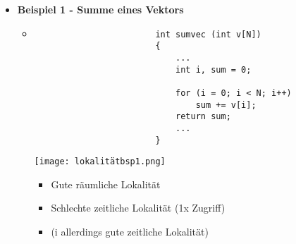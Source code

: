 \begin{itemize}
        \item \textbf{Beispiel 1 - Summe eines Vektors}
            \begin{itemize}
                \item[]
                    \begin{minipage}{0.35\textwidth}
                        \begin{verbatim}
                        int sumvec (int v[N])
                        {
                            ...
                            int i, sum = 0;

                            for (i = 0; i < N; i++)
                                sum += v[i];
                            return sum;
                            ...
                        }
                        \end{verbatim}
                    \end{minipage}
                    \begin{minipage}{0.5\textwidth}
                        \texttt{[image: lokalitätbsp1.png]}
                        \begin{itemize}
                            \item Gute räumliche Lokalität
                            \item Schlechte zeitliche Lokalität (1x Zugriff)
                            \item (i allerdings gute zeitliche Lokalität)
                        \end{itemize}
                    \end{minipage}
            \end{itemize}


\end{itemize}

